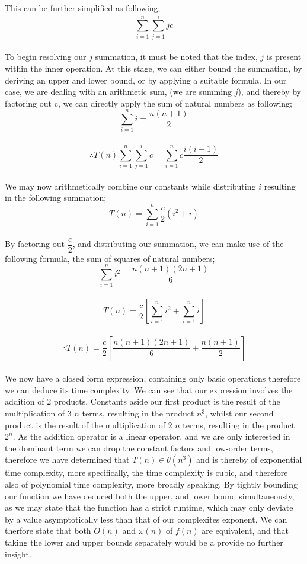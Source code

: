 \documentclass[a4paper]{article}
\begin{document}
This can be further simplified as following; \\
$$  \sum_{i=1}^n \sum_{j=1}^ijc  $$ \\
To begin resolving our $j$ summation, it must be noted that the index, $j$ is present within the inner operation. 
At this stage, we can either bound the summation, by deriving an upper and lower bound, or by applying a suitable formula. 
In our case, we are dealing with an arithmetic sum, (we are summing $j$), and thereby by factoring out c, we can directly apply
the sum of natural numbers as following; \\
$$ \sum_{i=1}^n i = \dfrac {n(n+1)}{2} $$\\
$$ \therefore T(n) \sum_{i=1}^n \sum_{j=1}^ic = \sum_{i=1}^nc \dfrac{i(i+1)}{2} $$\\ 
We may now arithmetically combine our constants while distributing $i$ resulting in the following summation; \\
$$ T(n) = \sum_{i=1}^n \dfrac {c}{2}(i^2+i) $$\\
By factoring out $\dfrac{c}{2}$, and distributing our summation, we can make use of the following formula, the sum of squares of natural numbers; \\
$$ \sum_{i=1}^n i^2 = \dfrac{n(n+1)(2n+1)}{6} $$ \\
$$ T(n) = \dfrac{c}{2} \left[ \sum_{i=1}^n i^2 + \sum_{i=1}^n i \right] $$ \\
$$ \therefore T(n) = \dfrac{c}{2} \left[ \dfrac{n(n+1)(2n+1)}{6} + \dfrac{n(n+1)}{2} \right] $$\\
We now have a closed form expression, containing only basic operations therefore we can deduce its time complexity. We can see that 
our expression involves the addition of 2 products. Constants aside our first product is the result of the multiplication of 3 $n$ terms, resulting in 
the product $n^3$, whilst our second product is the result of the multiplication of 2 $n$ terms, resulting in the product $2^n$. 
As the addition operator is a linear operator, and we are only interested in the dominant term we can drop the constant factors and low-order terms, therefore
we have determined that $T(n) \in \theta (n^3)$ and is thereby of exponential time complexity, more specifically,
the time complexity is cubic, and therefore also of polynomial time complexity, more broadly speaking.
By tightly bounding our function we have deduced both the upper, and lower bound simultaneously, 
as we may state that the function has a strict runtime, which may only deviate by a value asymptotically less than that of our complexites exponent,  We can therfore 
state that both $O(n)$ and $\omega(n)$ of $f(n)$ are equivalent, and that taking the lower and upper bounds separately would be a provide no further insight. \\
\end{document}
